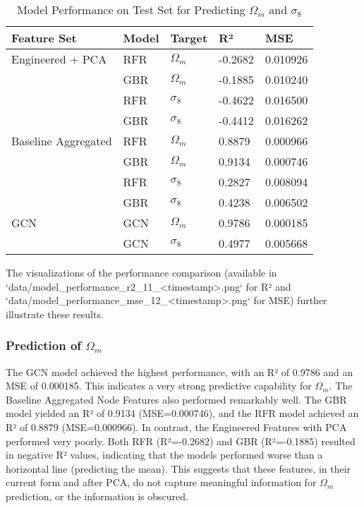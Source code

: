 \documentclass[twocolumn]{aastex631}
\begin{document}
\begin{table}[h!]
\centering
\caption{Model Performance on Test Set for Predicting $\Omega_m$ and $\sigma_8$}
\begin{tabular}{|l|l|l|l|l|}
\hline
Feature Set             & Model & Target    & R²      & MSE        \\ \hline
Engineered + PCA    & RFR   & $\Omega_m$  & -0.2682 & 0.010926   \\ \hline
                        & GBR   & $\Omega_m$  & -0.1885 & 0.010240   \\ \hline
                        & RFR   & $\sigma_8$  & -0.4622 & 0.016500   \\ \hline
                        & GBR   & $\sigma_8$  & -0.4412 & 0.016262   \\ \hline
Baseline Aggregated & RFR   & $\Omega_m$  & 0.8879  & 0.000966   \\ \hline
                        & GBR   & $\Omega_m$  & 0.9134  & 0.000746   \\ \hline
                        & RFR   & $\sigma_8$  & 0.2827  & 0.008094   \\ \hline
                        & GBR   & $\sigma_8$  & 0.4238  & 0.006502   \\ \hline
GCN                     & GCN   & $\Omega_m$  & 0.9786  & 0.000185   \\ \hline
                        & GCN   & $\sigma_8$  & 0.4977  & 0.005668   \\ \hline
\end{tabular}
\label{tab:model_performance}
\end{table}

The visualizations of the performance comparison (available in `data/model_performance_r2_11_<timestamp>.png` for R² and `data/model_performance_mse_12_<timestamp>.png` for MSE) further illustrate these results.

\subsubsection{Prediction of $\Omega_m$}
The GCN model achieved the highest performance, with an R² of 0.9786 and an MSE of 0.000185. This indicates a very strong predictive capability for $\Omega_m$. The Baseline Aggregated Node Features also performed remarkably well. The GBR model yielded an R² of 0.9134 (MSE=0.000746), and the RFR model achieved an R² of 0.8879 (MSE=0.000966). In contrast, the Engineered Features with PCA performed very poorly. Both RFR (R²=-0.2682) and GBR (R²=-0.1885) resulted in negative R² values, indicating that the models performed worse than a horizontal line (predicting the mean). This suggests that these features, in their current form and after PCA, do not capture meaningful information for $\Omega_m$ prediction, or the information is obscured.
\end{document}
